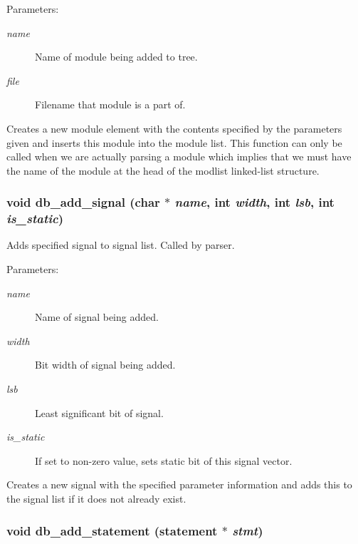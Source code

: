 \begin{Desc}
\item[Parameters: ]\par
\begin{description}
\item[{\em 
name}]Name of module being added to tree. \item[{\em 
file}]Filename that module is a part of.\end{description}
\end{Desc}
Creates a new module element with the contents specified by the parameters given and inserts this module into the module list. This function can only be called when we are actually parsing a module which implies that we must have the name of the module at the head of the modlist linked-list structure. 
\subsubsection{\setlength{\rightskip}{0pt plus 5cm}void db\_\-add\_\-signal (char $\ast$ {\em name}, int {\em width}, int {\em lsb}, int {\em is\_\-static})}\label{db_8c_a18}


Adds specified signal to signal list. Called by parser.

\begin{Desc}
\item[Parameters: ]\par
\begin{description}
\item[{\em 
name}]Name of signal being added. \item[{\em 
width}]Bit width of signal being added. \item[{\em 
lsb}]Least significant bit of signal. \item[{\em 
is\_\-static}]If set to non-zero value, sets static bit of this signal vector.\end{description}
\end{Desc}
Creates a new signal with the specified parameter information and adds this to the signal list if it does not already exist. 
\subsubsection{\setlength{\rightskip}{0pt plus 5cm}void db\_\-add\_\-statement ({\bf statement} $\ast$ {\em stmt})}\label{db_8c_a23}



